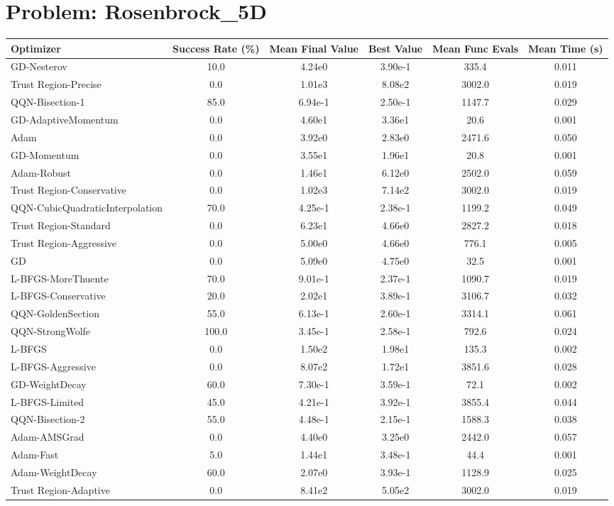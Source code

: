 \documentclass{article}
\begin{document}
\section{Problem: Rosenbrock\_5D}
\begin{longtable}{p{3cm}*{5}{c}}
\toprule
\textbf{Optimizer} & \textbf{Success Rate (\%)} & \textbf{Mean Final Value} & \textbf{Best Value} & \textbf{Mean Func Evals} & \textbf{Mean Time (s)} \\
\midrule
GD-Nesterov & 10.0 & 4.24e0 & 3.90e-1 & 335.4 & 0.011 \\
Trust Region-Precise & 0.0 & 1.01e3 & 8.08e2 & 3002.0 & 0.019 \\
QQN-Bisection-1 & 85.0 & 6.94e-1 & 2.50e-1 & 1147.7 & 0.029 \\
GD-AdaptiveMomentum & 0.0 & 4.60e1 & 3.36e1 & 20.6 & 0.001 \\
Adam & 0.0 & 3.92e0 & 2.83e0 & 2471.6 & 0.050 \\
GD-Momentum & 0.0 & 3.55e1 & 1.96e1 & 20.8 & 0.001 \\
Adam-Robust & 0.0 & 1.46e1 & 6.12e0 & 2502.0 & 0.059 \\
Trust Region-Conservative & 0.0 & 1.02e3 & 7.14e2 & 3002.0 & 0.019 \\
QQN-CubicQuadraticInterpolation & 70.0 & 4.25e-1 & 2.38e-1 & 1199.2 & 0.049 \\
Trust Region-Standard & 0.0 & 6.23e1 & 4.66e0 & 2827.2 & 0.018 \\
Trust Region-Aggressive & 0.0 & 5.00e0 & 4.66e0 & 776.1 & 0.005 \\
GD & 0.0 & 5.09e0 & 4.75e0 & 32.5 & 0.001 \\
L-BFGS-MoreThuente & 70.0 & 9.01e-1 & 2.37e-1 & 1090.7 & 0.019 \\
L-BFGS-Conservative & 20.0 & 2.02e1 & 3.89e-1 & 3106.7 & 0.032 \\
QQN-GoldenSection & 55.0 & 6.13e-1 & 2.60e-1 & 3314.1 & 0.061 \\
QQN-StrongWolfe & 100.0 & 3.45e-1 & 2.58e-1 & 792.6 & 0.024 \\
L-BFGS & 0.0 & 1.50e2 & 1.98e1 & 135.3 & 0.002 \\
L-BFGS-Aggressive & 0.0 & 8.07e2 & 1.72e1 & 3851.6 & 0.028 \\
GD-WeightDecay & 60.0 & 7.30e-1 & 3.59e-1 & 72.1 & 0.002 \\
L-BFGS-Limited & 45.0 & 4.21e-1 & 3.92e-1 & 3855.4 & 0.044 \\
QQN-Bisection-2 & 55.0 & 4.48e-1 & 2.15e-1 & 1588.3 & 0.038 \\
Adam-AMSGrad & 0.0 & 4.40e0 & 3.25e0 & 2442.0 & 0.057 \\
Adam-Fast & 5.0 & 1.44e1 & 3.48e-1 & 44.4 & 0.001 \\
Adam-WeightDecay & 60.0 & 2.07e0 & 3.93e-1 & 1128.9 & 0.025 \\
Trust Region-Adaptive & 0.0 & 8.41e2 & 5.05e2 & 3002.0 & 0.019 \\
\bottomrule
\end{longtable}
\end{document}
